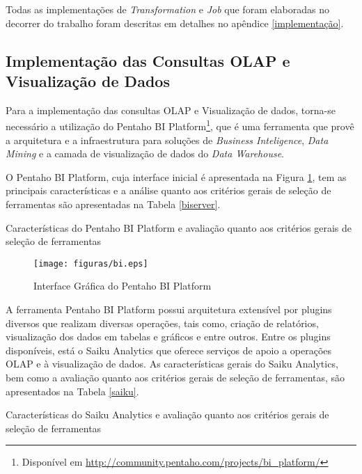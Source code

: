 Todas as implementações de \textit{Transformation} e \textit{Job} que foram elaboradas no decorrer do trabalho foram descritas em detalhes no apêndice \ref{implementação}.


\subsection{Implementação das Consultas OLAP e Visualização de Dados}

Para a implementação das consultas OLAP e Visualização de dados, torna-se necessário a utilização do Pentaho BI Platform\footnote{Disponível em \url{http://community.pentaho.com/projects/bi_platform/}}, que é uma ferramenta que provê a arquitetura e a infraestrutura para soluções de \textit{Business Inteligence}, \textit{Data Mining} e a camada de visualização de dados do \textit{Data Warehouse}.


O Pentaho BI Platform, cuja interface inicial é apresentada na Figura \ref{BIplatform}, tem as principais características e a análise quanto aos critérios gerais de seleção de ferramentas são apresentadas na Tabela \ref{biserver}. 


\begin{table}[!ht]

\caption{Características do Pentaho BI Platform e avaliação quanto aos critérios gerais de seleção de ferramentas}
\label{biserver}
\end{table}
\FloatBarrier



\begin{figure}[ht!]
\begin{center}
\texttt{[image: figuras/bi.eps]}
\caption{Interface Gráfica do Pentaho BI Platform}
\label{BIplatform}
\end{center}
\end{figure}
\FloatBarrier
 

A ferramenta Pentaho BI Platform possui arquitetura extensível por plugins diversos que realizam diversas operações, tais como, criação de relatórios, visualização dos dados em tabelas e gráficos e entre outros. Entre os plugins disponíveis, está o Saiku Analytics que oferece serviços de apoio a operações OLAP e à visualização de dados. As características gerais do Saiku Analytics, bem como a avaliação quanto aos critérios gerais de seleção de ferramentas, são apresentados na Tabela \ref{saiku}. 

\begin{table}[!ht]

\caption{Características do Saiku Analytics e avaliação quanto aos critérios gerais de seleção de ferramentas}
\label{saiku}
\end{table}
\FloatBarrier


